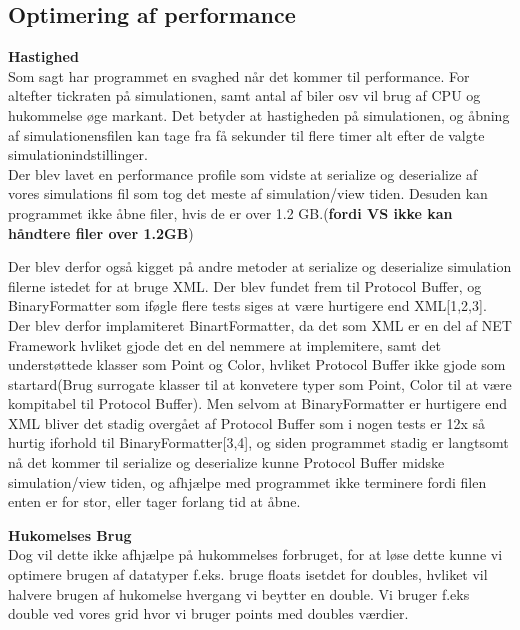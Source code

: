 \subsection{Optimering af performance}\label{OptimeringAfPerformance}

\textbf{Hastighed} \\
Som sagt har programmet en svaghed når det kommer til performance. For altefter tickraten på simulationen, samt antal af biler osv vil brug af CPU og hukommelse øge markant. Det betyder at hastigheden på simulationen, og åbning af simulationensfilen kan tage fra få sekunder til flere timer alt efter de valgte simulationindstillinger. \\
Der blev lavet en performance profile som vidste at serialize og deserialize af vores simulations fil som tog det meste af simulation/view tiden. Desuden kan programmet ikke åbne filer, hvis de er over 1.2 GB.(\textbf{fordi VS ikke kan håndtere filer over 1.2GB})

\vspace{5mm}

Der blev derfor også kigget på andre metoder at serialize og deserialize simulation filerne istedet for at bruge XML. Der blev fundet frem til Protocol Buffer, og BinaryFormatter som iføgle flere tests siges at være hurtigere end XML[1,2,3]. Der blev derfor implamiteret BinartFormatter, da det som XML er en del af NET Framework hvliket gjode det en del nemmere at implemitere, samt det understøttede klasser som Point og Color, hvliket Protocol Buffer ikke gjode som startard(Brug surrogate klasser til at konvetere typer som Point, Color til at være kompitabel til Protocol Buffer). Men selvom at BinaryFormatter er hurtigere end XML bliver det stadig overgået af Protocol Buffer som i nogen tests er 12x så hurtig iforhold til BinaryFormatter[3,4], og siden programmet stadig er langtsomt nå det kommer til serialize og deserialize kunne Protocol Buffer midske simulation/view tiden, og afhjælpe med programmet ikke terminere fordi filen enten er for stor, eller tager forlang tid at åbne.


\vspace{5mm}

\textbf{Hukomelses Brug} \\
Dog vil dette ikke afhjælpe på hukommelses forbruget, for at løse dette kunne vi optimere brugen af datatyper f.eks. bruge floats isetdet for doubles, hvliket vil halvere brugen af hukomelse hvergang vi beytter en double. Vi bruger f.eks double ved vores grid hvor vi bruger points med doubles værdier. \\


